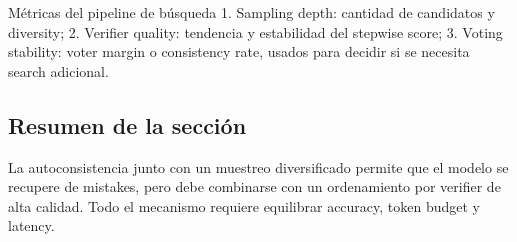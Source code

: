 \begin{knowledgebox}{Métricas del pipeline de búsqueda}
1. Sampling depth: cantidad de candidatos y diversity; 2. Verifier quality: tendencia y estabilidad del stepwise score; 3. Voting stability: voter margin o consistency rate, usados para decidir si se necesita search adicional.
\end{knowledgebox}

\subsection{Resumen de la sección}
La autoconsistencia junto con un muestreo diversificado permite que el modelo se recupere de mistakes, pero debe combinarse con un ordenamiento por verifier de alta calidad. Todo el mecanismo requiere equilibrar accuracy, token budget y latency.

